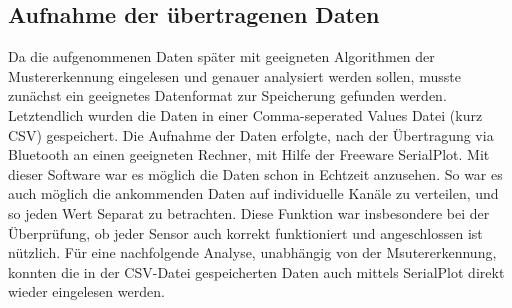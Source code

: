 \subsection{Aufnahme der {\"u}bertragenen Daten} \label{aufnahme-daten-1}

Da die aufgenommenen Daten später mit geeigneten Algorithmen der Mustererkennung eingelesen und genauer analysiert werden sollen, musste zunächst ein geeignetes Datenformat zur Speicherung gefunden werden.
Letztendlich wurden die Daten in einer Comma-seperated Values Datei (kurz CSV) gespeichert. 
Die Aufnahme der Daten erfolgte, nach der Übertragung via Bluetooth an einen geeigneten Rechner,  mit Hilfe der Freeware SerialPlot. Mit dieser Software war es möglich die Daten schon in Echtzeit anzusehen. 
So war es auch möglich die ankommenden Daten auf individuelle Kanäle zu verteilen, und so jeden Wert Separat zu betrachten. Diese Funktion war insbesondere bei der Überprüfung, ob jeder Sensor auch korrekt funktioniert und angeschlossen ist nützlich. 
Für eine nachfolgende Analyse, unabhängig von der Msutererkennung, konnten die in der CSV-Datei gespeicherten Daten auch mittels SerialPlot direkt wieder eingelesen werden. 